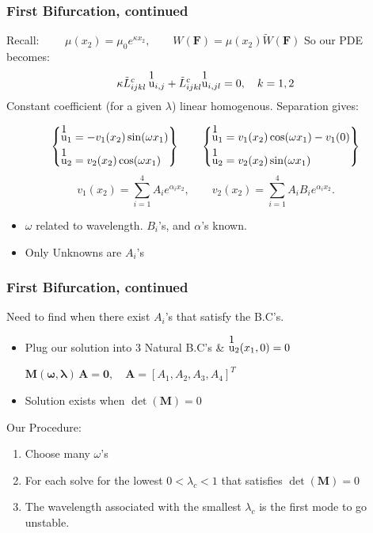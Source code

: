 \documentclass{beamer}
\begin{document}
\begin{frame}
\frametitle{\large First Bifurcation, continued}
Recall: $\qquad \mu(x_2) = \mu_0 e^{\kappa x_2}, \qquad W(\mathbf{F}) = \mu(x_2) \tilde{W}(\mathbf{F})$
\vspace{0.1in}
So our PDE becomes:
\footnotesize \begin{equation*}
 \kappa \tilde{L}^c_{ijkl} \: \stackon{u}{1}_{i,j} +  \tilde{L}^c_{ijkl}\stackon{u}{1}_{i,jl} = 0,  \quad k = 1,2
\end{equation*} \normalsize
Constant coefficient (for a given $\lambda$) linear homogenous. Separation gives:

\scriptsize \begin{equation*} 
\left \{ 
\begin{aligned} 
  \stackon{u}{1}_1 &= -v_1(x_2)\sin(\omega x_1) \\
  \stackon{u}{1}_2 &=  v_2(x_2)\cos(\omega x_1)
\end{aligned} 
\right \}  \qquad 
\left \{ 
\begin{aligned} 
  \stackon{u}{1}_1 &= v_1(x_2)\cos(\omega x_1) - v_1(0) \\
  \stackon{u}{1}_2 &=  v_2(x_2)\sin(\omega x_1)
\end{aligned} 
\right \}
\end{equation*} 
\normalsize
\begin{equation*}
v_1(x_2) = \sum_{i = 1}^{4}A_ie^{\alpha_i x_2}, \qquad v_2(x_2) = \sum_{i = 1}^{4} A_i B_i e^{\alpha_i x_2}.
\end{equation*}  
\begin{itemize} 
	\item $\omega$ related to wavelength. $B_i$'s, and $\alpha$'s known.
	\item Only Unknowns are $A_i$'s
\end{itemize}
\end{frame}

\begin{frame}
\frametitle{\large First Bifurcation, continued}
Need to find when there exist $A_i$'s that satisfy the B.C's.
\begin{itemize}
	\item Plug our solution into 3 Natural B.C's \& $\stackon{u}{1}_2(x_1, 0) = 0$ 
	\begin{center}
	$\mathbf{M(\omega, \lambda)} \, \mathbf{A} = \mathbf{0}, \quad \mathbf{A} = [ A_1, A_2, A_3, A_4 ]^T$ \end{center}
	\item Solution exists when $\det(\mathbf{M}) = 0$
\end{itemize}



Our Procedure:
\begin{enumerate}
	\item Choose many $\omega$'s
	\item For each solve for the lowest $0 < \lambda_c < 1$ that satisfies $\det(\mathbf{M}) = 0$
	\item The wavelength associated with the smallest $\lambda_c$ is the first mode to go unstable.  
\end{enumerate}

\end{frame}
\end{document}
